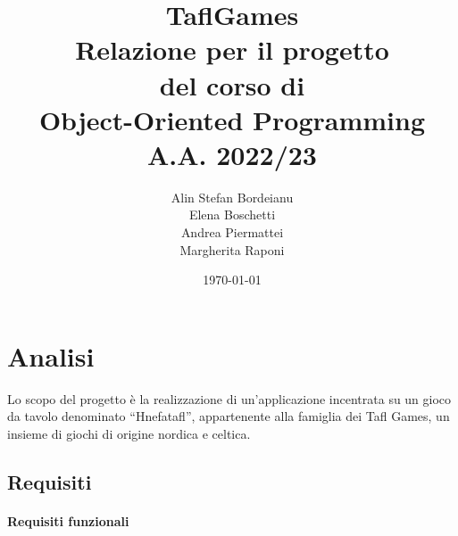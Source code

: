 \documentclass[a4paper,12pt]{report}
\title{TaflGames\\\large Relazione per il progetto \\ del corso di \\ Object-Oriented Programming \\ A.A. 2022/23}
\author{Alin Stefan Bordeianu \\ Elena Boschetti \\ Andrea Piermattei \\ Margherita Raponi}
\date{\today}
\begin{document}
\maketitle

\tableofcontents

\chapter{Analisi}

Lo scopo del progetto è la realizzazione di un'applicazione incentrata su un gioco da tavolo denominato “Hnefatafl”, appartenente alla famiglia dei Tafl Games, un insieme di giochi di origine nordica e celtica. 

\section{Requisiti}

\subsubsection{Requisiti funzionali}
\end{document}
